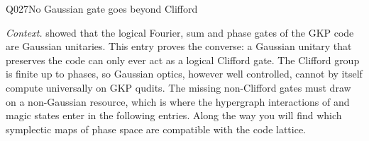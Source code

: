 \begin{entry}{Q027}{No Gaussian gate goes beyond Clifford}


\begin{problem}
\emph{Context.}  showed that the logical Fourier, sum and phase gates of the
GKP code are Gaussian unitaries. This entry proves the converse: a Gaussian unitary that
preserves the code can only ever act as a logical Clifford gate. The Clifford group is
finite up to phases, so Gaussian optics, however well controlled, cannot by itself compute
universally on GKP qudits. The missing non-Clifford gates must draw on a non-Gaussian
resource, which is where the hypergraph interactions of  and magic states enter
in the following entries. Along the way you will find which symplectic maps of phase space
are compatible with the code lattice.


\end{problem}
\end{entry}
